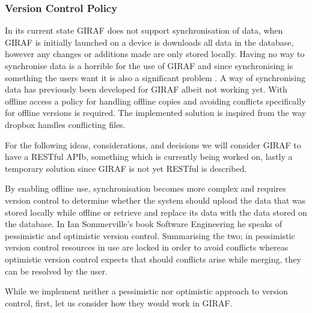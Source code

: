 \subsubsection*{Version Control Policy}
In its current state GIRAF does not support synchronisation of data, when GIRAF is initially launched on a device is downloads all data in the database, however any changes or additions made are only stored locally.
Having no way to synchronise data is a horrible  for the use of GIRAF and since synchronising is something the users want it is also a significant problem .
A way of synchronising data has previously been developed for GIRAF albeit not working yet.
With offline access a policy for handling offline copies and avoiding conflicts specifically for offline versions is required. 
The implemented solution is inspired from the way dropbox handles conflicting files.  

\bigskip
For the following ideas, considerations, and decisions we will consider GIRAF to have a RESTful APIb, something which is currently being worked on, lastly a temporary solution since GIRAF is not yet RESTful is described. 

By enabling offline use, synchronisation becomes more complex  and requires version control to determine whether the system should upload the data that was stored locally while offline or retrieve and replace its data with the data stored on the database.
In Ian Sommerville's book Software Engineering \citep{SEBOOK} he speaks of pessimistic and optimistic version control.
Summarising the two; in pessimistic version control resources in use are locked in order to avoid conflicts whereas optimistic version control expects that should conflicts arise while merging, they can be resolved by the user.

\bigskip  \noindent
While we implement neither a pessimistic nor optimistic approach to version control, first, let us consider how they would work in GIRAF. 

